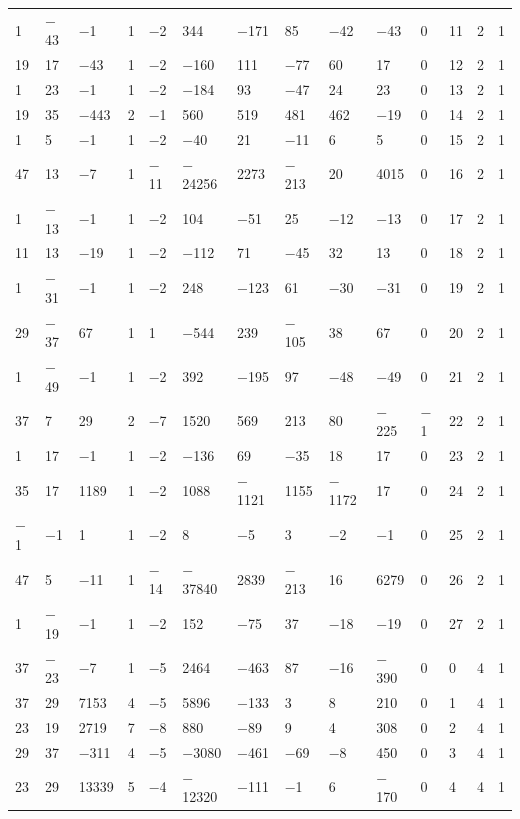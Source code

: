 \documentclass[10pt,a4paper]{amsart}
\numberwithin{equation}{section}
\theoremstyle{definition}
\numberwithin{table}{section}
\begin{document}
{\begin{paracol}{3}
\begin{supertabular}{|w{c}{.32cm}w{c}{.32cm}w{c}{.32cm}@{\hspace{.5cm}}w{c}{.2cm}w{c}{.2cm}|@{\hspace{\tabcolsep}}HHHHHHw{c}{.17cm}w{c}{.17cm}w{c}{.17cm}|}
			1 & $-$43 & $-$1 & 1 & $-$2 & 344 & $-$171 & 85 & $-$42 & $-$43 & 0 & 11 & 2 & 1 \\
			19 & 17 & $-$43 & 1 & $-$2 & $-$160 & 111 & $-$77 & 60 & 17 & 0 & 12 & 2 & 1 \\
			1 & 23 & $-$1 & 1 & $-$2 & $-$184 & 93 & $-$47 & 24 & 23 & 0 & 13 & 2 & 1 \\
			19 & 35 & $-$443 & 2 & $-$1 & 560 & 519 & 481 & 462 & $-$19 & 0 & 14 & 2 & 1 \\
			1 & 5 & $-$1 & 1 & $-$2 & $-$40 & 21 & $-$11 & 6 & 5 & 0 & 15 & 2 & 1 \\
			47 & 13 & $-$7 & 1 & $-$11 & $-$24256 & 2273 & $-$213 & 20 & 4015 & 0 & 16 & 2 & 1 \\
			1 & $-$13 & $-$1 & 1 & $-$2 & 104 & $-$51 & 25 & $-$12 & $-$13 & 0 & 17 & 2 & 1 \\
			11 & 13 & $-$19 & 1 & $-$2 & $-$112 & 71 & $-$45 & 32 & 13 & 0 & 18 & 2 & 1 \\
			1 & $-$31 & $-$1 & 1 & $-$2 & 248 & $-$123 & 61 & $-$30 & $-$31 & 0 & 19 & 2 & 1 \\
			29 & $-$37 & 67 & 1 & 1 & $-$544 & 239 & $-$105 & 38 & 67 & 0 & 20 & 2 & 1 \\
			1 & $-$49 & $-$1 & 1 & $-$2 & 392 & $-$195 & 97 & $-$48 & $-$49 & 0 & 21 & 2 & 1 \\
			37 & 7 & 29 & 2 & $-$7 & 1520 & 569 & 213 & 80 & $-$225 & $-$1 & 22 & 2 & 1 \\
			1 & 17 & $-$1 & 1 & $-$2 & $-$136 & 69 & $-$35 & 18 & 17 & 0 & 23 & 2 & 1 \\
			35 & 17 & 1189 & 1 & $-$2 & 1088 & $-$1121 & 1155 & $-$1172 & 17 & 0 & 24 & 2 & 1 \\
			$-$1 & $-$1 & 1 & 1 & $-$2 & 8 & $-$5 & 3 & $-$2 & $-$1 & 0 & 25 & 2 & 1 \\
			47 & 5 & $-$11 & 1 & $-$14 & $-$37840 & 2839 & $-$213 & 16 & 6279 & 0 & 26 & 2 & 1 \\
			1 & $-$19 & $-$1 & 1 & $-$2 & 152 & $-$75 & 37 & $-$18 & $-$19 & 0 & 27 & 2 & 1 \\
			37 & $-$23 & $-$7 & 1 & $-$5 & 2464 & $-$463 & 87 & $-$16 & $-$390 & 0 & 0 & 4 & 1 \\
			37 & 29 & 7153 & 4 & $-$5 & 5896 & $-$133 & 3 & 8 & 210 & 0 & 1 & 4 & 1 \\
			23 & 19 & 2719 & 7 & $-$8 & 880 & $-$89 & 9 & 4 & 308 & 0 & 2 & 4 & 1 \\
			29 & 37 & $-$311 & 4 & $-$5 & $-$3080 & $-$461 & $-$69 & $-$8 & 450 & 0 & 3 & 4 & 1 \\
			23 & 29 & 13339 & 5 & $-$4 & $-$12320 & $-$111 & $-$1 & 6 & $-$170 & 0 & 4 & 4 & 1 \\

\end{supertabular}
\end{paracol}}
\end{document}
